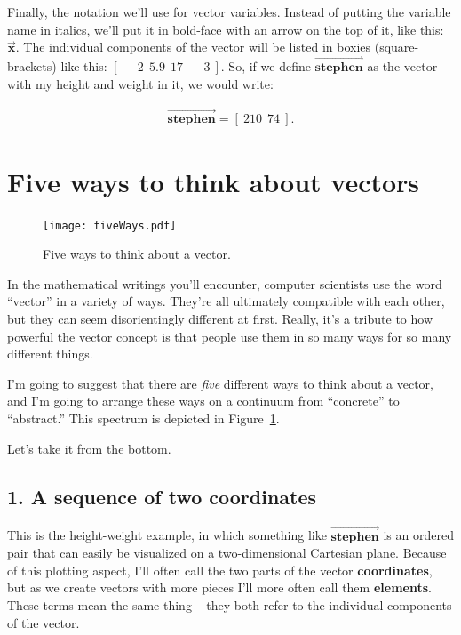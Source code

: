 \smallskip

Finally, the notation we'll use for vector variables. Instead of putting the
variable name in italics, we'll put it in bold-face with an arrow on the top of
it, like this: $\overrightarrow{\textbf{x}}$. The individual components of the
vector will be listed in boxies (square-brackets) like this: $[\ -2\ \ 5.9\ \
17\ \ -3\ ]$. So, if we define $\overrightarrow{\textbf{stephen}}$ as the
vector with my height and weight in it, we would write:

\vspace{-.15in}

\begin{align*}
\overrightarrow{\textbf{stephen}} = [\ 210\ \ 74 \ ].
\end{align*}

\medskip

\section{Five ways to think about vectors}

\begin{figure}[ht]
\centering
\texttt{[image: fiveWays.pdf]}
\caption{Five ways to think about a vector.}
\label{fig:fiveWays}
\end{figure}


In the mathematical writings you'll encounter, computer scientists use the word
``vector'' in a variety of ways. They're all ultimately compatible with each
other, but they can seem disorientingly different at first. Really, it's a
tribute to how powerful the vector concept is that people use them in so many
ways for so many different things.

I'm going to suggest that there are \textit{five} different ways to think about
a vector, and I'm going to arrange these ways on a continuum from ``concrete''
to ``abstract.'' This spectrum is depicted in Figure~\ref{fig:fiveWays}.

Let's take it from the bottom.

\subsection{1. A sequence of two coordinates}

This is the height-weight example, in which something like
$\overrightarrow{\textbf{stephen}}$ is an ordered pair that can easily be
visualized on a two-dimensional Cartesian plane. Because of this plotting
aspect, I'll often call the two parts of the vector \textbf{coordinates}, but
as we create vectors with more pieces I'll more often call them
\textbf{elements}. These terms mean the same thing -- they both refer to the
individual components of the vector.

